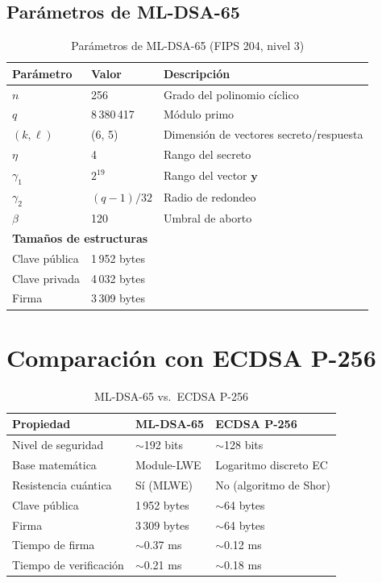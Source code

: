 \documentclass[12pt,a4paper,twoside,openright]{book}
\theoremstyle{plain}
\theoremstyle{definition}
\theoremstyle{remark}
\newcommand{\vv}[1]{\mathbf{#1}}
\begin{document}
\subsection{Par\'ametros de ML-DSA-65}

\begin{table}[H]
\centering
\caption{Par\'ametros de ML-DSA-65 (FIPS 204, nivel 3)}
\label{tab:params_mldsa65}
\begin{tabular}{lll}
\toprule
\textbf{Par\'ametro} & \textbf{Valor} & \textbf{Descripci\'on} \\
\midrule
$n$ & 256 & Grado del polinomio c\'iclico \\
$q$ & 8\,380\,417 & M\'odulo primo \\
$(k, \ell)$ & (6, 5) & Dimensi\'on de vectores secreto/respuesta \\
$\eta$ & 4 & Rango del secreto \\
$\gamma_1$ & $2^{19}$ & Rango del vector $\vv{y}$ \\
$\gamma_2$ & $(q-1)/32$ & Radio de redondeo \\
$\beta$ & 120 & Umbral de aborto \\
\midrule
\multicolumn{3}{l}{\textbf{Tama\~nos de estructuras}} \\
Clave p\'ublica & 1\,952 bytes & \\
Clave privada & 4\,032 bytes & \\
Firma & 3\,309 bytes & \\
\bottomrule
\end{tabular}
\end{table}

\section{Comparaci\'on con ECDSA P-256}

\begin{table}[H]
\centering
\caption{ML-DSA-65 vs.\ ECDSA P-256}
\label{tab:comp_firmas}
\begin{tabular}{lll}
\toprule
\textbf{Propiedad} & \textbf{ML-DSA-65} & \textbf{ECDSA P-256} \\
\midrule
Nivel de seguridad & $\sim$192 bits & $\sim$128 bits \\
Base matem\'atica & Module-LWE & Logaritmo discreto EC \\
Resistencia cu\'antica & S\'i (MLWE) & No (algoritmo de Shor) \\
Clave p\'ublica & 1\,952 bytes & $\sim$64 bytes \\
Firma & 3\,309 bytes & $\sim$64 bytes \\
Tiempo de firma & $\sim$0.37 ms & $\sim$0.12 ms \\
Tiempo de verificaci\'on & $\sim$0.21 ms & $\sim$0.18 ms \\
\bottomrule
\end{tabular}
\end{table}
\end{document}
